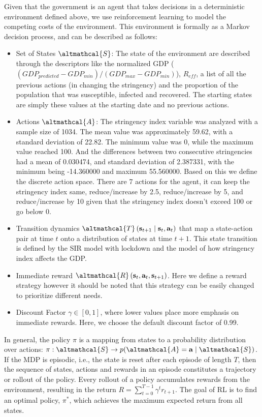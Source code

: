 \documentclass[tikz,fleqn,12pt]{wlscirep}
\begin{document}
Given that the government is an agent that takes decisions in a deterministic environment defined above, we use reinforcement learning to model the competing costs of the environment. This environment is formally as a Markov decision process, and can be described as follows:
\begin{itemize}
    \item Set of States $\altmathcal{S}$: The state of the environment are described through the descriptors like the normalized GDP ($(GDP_{predicted} - GDP_{min}) / (GDP_{max} - GDP_{min})$), $R_{eff}$, a list of all the previous actions (in changing the stringency) and the proportion of the population that was susceptible, infected and recovered. The starting states are simply these values at the starting date and no previous actions.
    \item Actions $\altmathcal{A}$: The stringency index variable was analyzed with a sample size of 1034. The mean value was approximately 59.62, with a standard deviation of 22.82. The minimum value was 0, while the maximum value reached 100. And the differences between two consecutive stringencies had a mean of 0.030474, and standard deviation of 2.387331, with the minimum being -14.360000 and maximum 55.560000. Based on this we define the discrete action space. There are 7 actions for the agent, it can keep the stringency index same, reduce/increase by 2.5, reduce/increase by 5, and reduce/increase by 10 given that the stringency index doesn't exceed 100 or go below 0.
    \item Transition dynamics $\altmathcal{T}\left(\mathbf{s}_{t+1} \mid \mathbf{s}_t, \mathbf{a}_t\right)$ that map a state-action pair at time $t$ onto a distribution of states at time $t+1$. This state transition is defined by the SIR model with lockdown and the model of how stringency index affects the GDP.
    \item Immediate reward $\altmathcal{R}\left(\mathbf{s}_t, \mathbf{a}_t, \mathbf{s}_{t+1}\right)$. Here we define a reward strategy however it should be noted that this strategy can be easily changed to prioritize different needs.
    \item Discount Factor $\gamma \in[0,1]$, where lower values place more emphasis on immediate rewards. Here, we choose the default discount factor of 0.99.
\end{itemize}
In general, the policy $\pi$ is a mapping from states to a probability distribution over actions: $\pi: \altmathcal{S} \rightarrow p(\altmathcal{A}=\mathbf{a} \mid \altmathcal{S})$. If the MDP is episodic, i.e., the state is reset after each episode of length $T$, then the sequence of states, actions and rewards in an episode constitutes a trajectory or rollout of the policy. Every rollout of a policy accumulates rewards from the environment, resulting in the return $R=\sum_{t=0}^{T-1} \gamma^t r_{t+1}$. The goal of RL is to find an optimal policy, $\pi^*$, which achieves the maximum expected return from all states.
\end{document}
